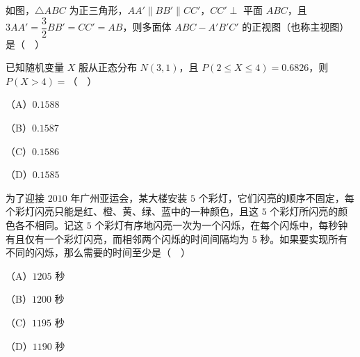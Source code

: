 \begingroup
\renewenvironment{question}{\Needspace{0.5\textheight}}{}
\begin{question}
如图，$\triangle ABC$ 为正三角形，$AA'\parallel BB'\parallel CC'$，$CC'\perp$ 平面 $ABC$，且 $3AA'=\dfrac32BB'=CC'=AB$，则多面体 $ABC-A'B'C'$ 的正视图（也称主视图）是（　）
\nopagebreak[4]
\begin{center}\end{center}
\nopagebreak[4]
\nopagebreak[4]
\begin{center}\end{center}
\nopagebreak[4]
\end{question}
\endgroup
\begin{question}
已知随机变量 $X$ 服从正态分布 $N(3,1)$，且 $P(2\leqslant X\leqslant4)=0.6826$，则 $P(X>4)=$（　）

（A）$0.1588$

（B）$0.1587$

（C）$0.1586$

（D）$0.1585$

\end{question}
\begin{question}
为了迎接 $2010$ 年广州亚运会，某大楼安装 $5$ 个彩灯，它们闪亮的顺序不固定，每个彩灯闪亮只能是红、橙、黄、绿、蓝中的一种颜色，且这 $5$ 个彩灯所闪亮的颜色各不相同。记这 $5$ 个彩灯有序地闪亮一次为一个闪烁，在每个闪烁中，每秒钟有且仅有一个彩灯闪亮，而相邻两个闪烁的时间间隔均为 $5$ 秒。如果要实现所有不同的闪烁，那么需要的时间至少是（　）

（A）$1205$ 秒

（B）$1200$ 秒

（C）$1195$ 秒

（D）$1190$ 秒

\end{question}

